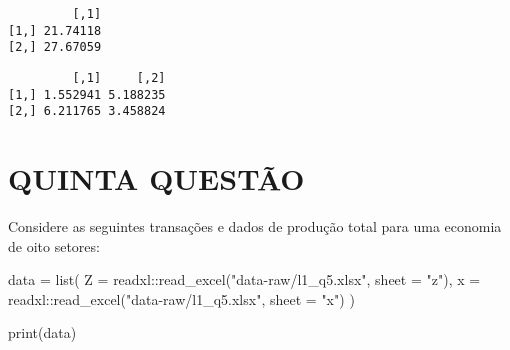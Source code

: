 \documentclass[
  letterpaper,
  DIV=11,
  numbers=noendperiod]{scrreprt}
\newenvironment{Shaded}{\begin{snugshade}}{\end{snugshade}}
\newcommand{\AttributeTok}[1]{\textcolor[rgb]{0.80,0.80,0.80}{#1}}
\newcommand{\CommentTok}[1]{\textcolor[rgb]{0.50,0.62,0.50}{#1}}
\newcommand{\DecValTok}[1]{\textcolor[rgb]{0.86,0.86,0.80}{#1}}
\newcommand{\FunctionTok}[1]{\textcolor[rgb]{0.94,0.94,0.56}{#1}}
\newcommand{\NormalTok}[1]{\textcolor[rgb]{0.80,0.80,0.80}{#1}}
\newcommand{\OtherTok}[1]{\textcolor[rgb]{0.94,0.94,0.56}{#1}}
\newcommand{\SpecialCharTok}[1]{\textcolor[rgb]{0.86,0.64,0.64}{#1}}
\newcommand{\StringTok}[1]{\textcolor[rgb]{0.80,0.58,0.58}{#1}}
\begin{document}
\begin{verbatim}
         [,1]
[1,] 21.74118
[2,] 27.67059
\end{verbatim}

\begin{Shaded}
\end{Shaded}

\begin{verbatim}
         [,1]     [,2]
[1,] 1.552941 5.188235
[2,] 6.211765 3.458824
\end{verbatim}

\chapter{QUINTA QUESTÃO}\label{quinta-questuxe3o}

Considere as seguintes transações e dados de produção total para uma
economia de oito setores:

\begin{Shaded}
\begin{Highlighting}[numbers=left,,]
\NormalTok{data }\OtherTok{=} \FunctionTok{list}\NormalTok{(}
  \AttributeTok{Z =}\NormalTok{ readxl}\SpecialCharTok{::}\FunctionTok{read\_excel}\NormalTok{(}\StringTok{"data{-}raw/l1\_q5.xlsx"}\NormalTok{, }\AttributeTok{sheet =} \StringTok{"z"}\NormalTok{),}
  \AttributeTok{x =}\NormalTok{ readxl}\SpecialCharTok{::}\FunctionTok{read\_excel}\NormalTok{(}\StringTok{"data{-}raw/l1\_q5.xlsx"}\NormalTok{, }\AttributeTok{sheet =} \StringTok{"x"}\NormalTok{)}
\NormalTok{)}

\FunctionTok{print}\NormalTok{(data)}
\end{Highlighting}
\end{Shaded}
\end{document}

